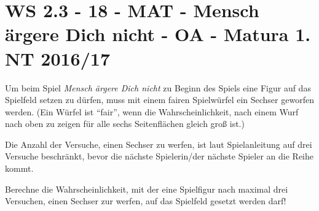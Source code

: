 \section{WS 2.3 - 18 - MAT - Mensch ärgere Dich nicht - OA - Matura 1. NT 2016/17}

\begin{beispiel}[WS 2.3]{1} %
Um beim Spiel \textit{Mensch ärgere Dich nicht} zu Beginn des Spiels eine Figur auf das Spielfeld setzen zu dürfen, muss mit einem fairen Spielwürfel ein Sechser geworfen werden. (Ein Würfel ist "`fair"', wenn die Wahrscheinlichkeit, nach einem Wurf nach oben zu zeigen für alle sechs Seitenflächen gleich groß ist.)

Die Anzahl der Versuche, einen Sechser zu werfen, ist laut Spielanleitung auf drei Versuche beschränkt, bevor die nächste Spielerin/der nächste Spieler an die Reihe kommt.

Berechne die Wahrscheinlichkeit, mit der eine Spielfigur nach maximal drei Versuchen, einen Sechser zur werfen, auf das Spielfeld gesetzt werden darf!

\end{beispiel}